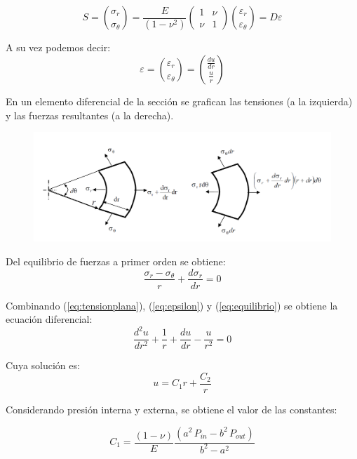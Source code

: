 \begin{equation}
S=\binom{\sigma_r}{\sigma_\theta}
= \frac{E}{(1-\nu^2)}
\begin{pmatrix}
1 & \nu \\
\nu & 1
\end{pmatrix}
\binom{\varepsilon_r}{\varepsilon_\theta}
=D \varepsilon
\label{eq:tensionplana}
\end{equation}

A su vez podemos decir:
\begin{equation}
\varepsilon=
\binom{\varepsilon_r}{\varepsilon_\theta}=
\binom{\frac{du}{dr}}{\frac{u}{r}}
\label{eq:epsilon}
\end{equation}

En un elemento diferencial de la secci\'on se grafican las tensiones (a la izquierda) y las fuerzas resultantes (a la derecha).
\begin{figure}[h!]
\centering
\includegraphics[width=\textwidth]{zunchado2.png}
\end{figure}

Del equilibrio de fuerzas a primer orden se obtiene:
\begin{equation}
\frac{\sigma_r-\sigma_\theta}{r}+\frac{d\sigma_r}{dr}=0
\label{eq:equilibrio}
\end{equation}

Combinando (\ref{eq:tensionplana}), (\ref{eq:epsilon}) y (\ref{eq:equilibrio}) se obtiene la ecuaci\'on diferencial:
\begin{equation}
\frac{d^2u}{dr^2}+\frac{1}{r}+\frac{du}{dr}-\frac{u}{r^2}=0
\end{equation}

Cuya soluci\'on es:
\begin{equation}
u=C_1r+\frac{C_2}{r}
\end{equation}

Considerando presi\'on interna y externa, se obtiene el valor de las constantes:

\begin{equation}
C_1=\frac{(1-\nu)}{E}\frac{(a^2\,P_{in}-b^2\,P_{out})}{b^2-a^2}
\end{equation}


